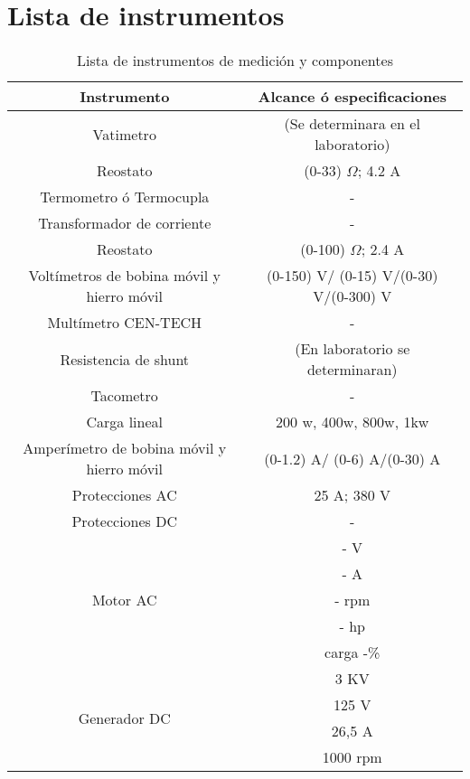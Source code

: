 \documentclass[11pt,letterpaper]{article}     %
\begin{document}
\section{Lista de instrumentos}
\begin{table}[H]
	\caption{Lista de instrumentos de medición y componentes}
	\centering
	\begin{tabular}{|c|c|}
		\hline 
		Instrumento & Alcance ó especificaciones \\ \hline 
		Vatimetro &  (Se determinara en el laboratorio) \\  
		\hline 
		Reostato &  (0-33) $\Omega$; 4.2 A \\  
		\hline
		Termometro ó Termocupla &  - \\  
		\hline
		Transformador de corriente &  - \\  
		\hline
		Reostato &  (0-100) $\Omega$; 2.4 A \\  
		\hline
		Voltímetros de bobina móvil y hierro móvil &  (0-150) V/ (0-15) V/(0-30) V/(0-300) V\\  
		\hline 
		Multímetro CEN-TECH & -\\  
		\hline 
		Resistencia de shunt & (En laboratorio se determinaran)\\  
		\hline
		Tacometro & -\\  
		\hline
		Carga lineal & 200 w, 400w, 800w, 1kw\\  
		\hline
		Amperímetro de bobina móvil y hierro móvil &(0-1.2) A/ (0-6) A/(0-30) A \\ 
		\hline
		Protecciones AC & 25 A; 380 V\\ 
		\hline
		Protecciones DC & -\\ 
		\hline
		\multirow{5}{3cm}{Motor AC} & - V \\ 
		\cline{2-2}
		& - A  \\
		\cline{2-2}
		& - rpm\\
		\cline{2-2}
		&- hp\\
		\cline{2-2}
		&carga -\%\\
		\hline
		\multirow{5}{3cm}{Generador DC} & 3 KV\\ 
		\cline{2-2}
		& 125 V \\
		\cline{2-2}
		&26,5 A\\
		\cline{2-2}
		& 1000 rpm\\
		\hline
		
		
	\end{tabular} 
\end{table}
\end{document}
